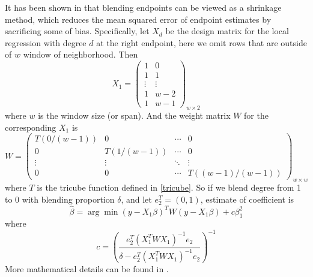 It has been shown in \cite{hafen2010local} that blending endpoints can be viewed
as a shrinkage method, which reduces the mean squared error of endpoint estimates
by sacrificing some of bias. Specifically, let $X_d$ be the design matrix for the
local regression with degree $d$ at the right endpoint, here we omit rows that
are outside of $w$ window of neighborhood. Then
\begin{equation}
X_1 =  
\begin{pmatrix}
  1 & 0  \\
  1 & 1  \\
  \vdots &  \vdots  \\
  1 & w-2 \\
  1 & w-1 
\end{pmatrix}
_{w \times 2}
\end{equation}
where $w$ is the window size (or span). And the weight matrix $W$ for the 
corresponding $X_1$ is
\begin{equation}
W =  
\begin{pmatrix}
  T(0/(w-1)) & 0 & \cdots & 0 \\
  0 & T(1/(w-1)) & \cdots & 0 \\
  \vdots  & \vdots & \ddots & \vdots  \\
  0 & 0 & \cdots & T((w-1)/(w-1)) 
\end{pmatrix}
_{w \times w}
\end{equation}
where $T$ is the tricube function defined in \ref{tricube}. So if we blend degree
from 1 to 0 with blending proportion $\delta$, and let $e_2^T = (0,1)$, estimate 
of coefficient is
\begin{equation}
\hat \beta = \arg \min (y- X_1\beta)^TW(y - X_1\beta) + c\beta_1^2
\end{equation}
where 
\begin{equation}
c = \left(\frac{e_2^T(X_1^TWX_1)^{-1}e_2}{\delta - e_2^T(X_1^TWX_1)^{-1}e_2}\right)^{-1}
\end{equation}
More mathematical details can be found in \cite{hafen2010local}.
